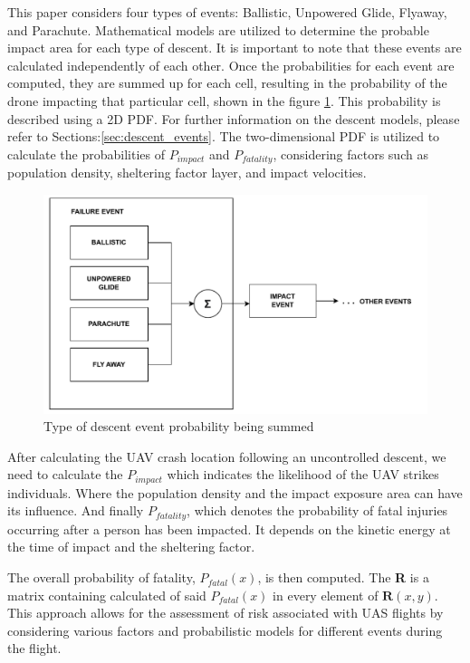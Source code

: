 \documentclass[12pt]{report}
\begin{document}
        This paper considers four types of events: Ballistic, Unpowered Glide, Flyaway, and Parachute. Mathematical
        models are utilized to determine the probable impact area for each type of descent. It is important to note that
        these events are calculated independently of each other. Once the probabilities for each event are computed,
        they are summed up for each cell, resulting in the probability of the drone impacting that particular cell,
        shown in the figure \ref{fig:summer}. This probability is described using a 2D \ac{PDF}. For further information
        on the descent models, please refer to Sections:\ref{sec:descent_events}. The two-dimensional PDF is utilized to
        calculate the probabilities of \(P_{impact}\) and \(P_{fatality}\), considering factors such as population
        density, sheltering factor layer, and impact velocities.

        \begin{figure}[H]
            \centering
            \includegraphics[width=\textwidth]{General Image/OSM Drone-LOGIC_SUM.pdf}
            \caption{Type of descent event probability being summed}
            \label{fig:summer}
        \end{figure}

        After calculating the UAV crash location following an uncontrolled descent, we need to calculate the
        \(P_{impact}\) which indicates the likelihood of the UAV strikes individuals. Where the population density and
        the impact exposure area can have its influence. And finally \(P_{fatality}\), which denotes the probability of
        fatal injuries occurring after a person has been impacted. It depends on the kinetic energy at the time of
        impact and the sheltering factor.

        The overall probability of fatality, \(P_{fatal}(x)\), is then computed. The \textbf{R} is a matrix
        containing calculated of said \(P_{fatal}(x)\) in every element of \(\mathbf{R}(x, y)\). This approach allows
        for the assessment of risk associated with UAS flights by considering various factors and probabilistic models
        for different events during the flight.
\end{document}
